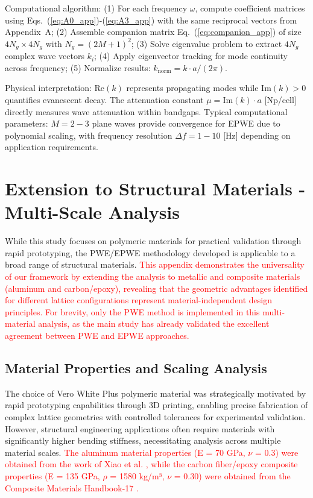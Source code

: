 \documentclass[review,numbers,sort&compress]{elsarticle}
\begin{document}
Computational algorithm: (1) For each frequency $\omega$, compute coefficient matrices using Eqs.~(\ref{eq:A0_app})-(\ref{eq:A3_app}) with the same reciprocal vectors from Appendix~A; (2) Assemble companion matrix Eq.~(\ref{eq:companion_app}) of size $4N_g \times 4N_g$ with $N_g = (2M+1)^2$; (3) Solve eigenvalue problem to extract $4N_g$ complex wave vectors $k_i$; (4) Apply eigenvector tracking for mode continuity across frequency; (5) Normalize results: $k_{\text{norm}} = k \cdot a/(2\pi)$.

Physical interpretation: $\text{Re}(k)$ represents propagating modes while $\text{Im}(k) > 0$ quantifies evanescent decay. The attenuation constant $\mu = \text{Im}(k) \cdot a$ [Np/cell] directly measures wave attenuation within bandgaps. Typical computational parameters: $M = 2-3$ plane waves provide convergence for EPWE due to polynomial scaling, with frequency resolution $\Delta f = 1-10$ [Hz] depending on application requirements.


\newpage
\section{Extension to Structural Materials - Multi-Scale Analysis}\label{multi_material_analysis}

While this study focuses on polymeric materials for practical validation through rapid prototyping, the PWE/EPWE methodology developed is applicable to a broad range of structural materials. \textcolor{red}{This appendix demonstrates the universality of our framework by extending the analysis to metallic and composite materials (aluminum and carbon/epoxy), revealing that the geometric advantages identified for different lattice configurations represent material-independent design principles. For brevity, only the PWE method is implemented in this multi-material analysis, as the main study has already validated the excellent agreement between PWE and EPWE approaches.}

\subsection{Material Properties and Scaling Analysis}

The choice of Vero White Plus polymeric material was strategically motivated by rapid prototyping capabilities through 3D printing, enabling precise fabrication of complex lattice geometries with controlled tolerances for experimental validation. However, structural engineering applications often require materials with significantly higher bending stiffness, necessitating analysis across multiple material scales. \textcolor{red}{The aluminum material properties (E = 70 GPa, $\nu$ = 0.3) were obtained from the work of Xiao et al. \cite{Xiao_2012}, while the carbon fiber/epoxy composite properties (E = 135 GPa, $\rho$ = 1580 kg/m³, $\nu$ = 0.30) were obtained from the Composite Materials Handbook-17 \cite{CMH17_2012}.}
\end{document}

